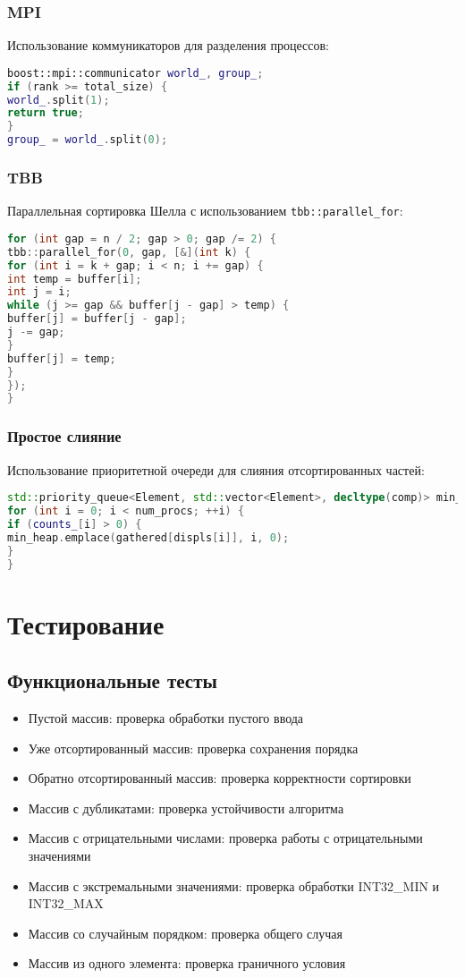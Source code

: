 \documentclass[12pt]{article}
\begin{document}
\subsubsection{MPI}
Использование коммуникаторов для разделения процессов:
\begin{lstlisting}[language=C++, caption=Фрагмент кода MPI]
boost::mpi::communicator world_, group_;
if (rank >= total_size) {
world_.split(1);
return true;
}
group_ = world_.split(0);
\end{lstlisting}

\subsubsection{TBB}
Параллельная сортировка Шелла с использованием \texttt{tbb::parallel_for}:
\begin{lstlisting}[language=C++, caption=Фрагмент кода TBB]
for (int gap = n / 2; gap > 0; gap /= 2) {
tbb::parallel_for(0, gap, [&](int k) {
for (int i = k + gap; i < n; i += gap) {
int temp = buffer[i];
int j = i;
while (j >= gap && buffer[j - gap] > temp) {
buffer[j] = buffer[j - gap];
j -= gap;
}
buffer[j] = temp;
}
});
}
\end{lstlisting}

\subsubsection{Простое слияние}
Использование приоритетной очереди для слияния отсортированных частей:
\begin{lstlisting}[language=C++, caption=Фрагмент кода простого слияния]
std::priority_queue<Element, std::vector<Element>, decltype(comp)> min_heap(comp);
for (int i = 0; i < num_procs; ++i) {
if (counts_[i] > 0) {
min_heap.emplace(gathered[displs[i]], i, 0);
}
}
\end{lstlisting}

\section{Тестирование}
\subsection{Функциональные тесты}
\begin{itemize}
\item Пустой массив: проверка обработки пустого ввода
\item Уже отсортированный массив: проверка сохранения порядка
\item Обратно отсортированный массив: проверка корректности сортировки
\item Массив с дубликатами: проверка устойчивости алгоритма
\item Массив с отрицательными числами: проверка работы с отрицательными значениями
\item Массив с экстремальными значениями: проверка обработки INT32_MIN и INT32_MAX
\item Массив со случайным порядком: проверка общего случая
\item Массив из одного элемента: проверка граничного условия
\end{itemize}
\end{document}
